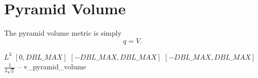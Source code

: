 \section{Pyramid Volume}

The pyramid volume metric is simply
\[
q = V.
\]

%
{$L^3$}%
{$[0,DBL\_MAX]$}%
{$[-DBL\_MAX,DBL\_MAX]$}%
{$[-DBL\_MAX,DBL\_MAX]$}%
{$\frac{1}{3\sqrt{2}}$}%
{--}%
{v\_pyramid\_volume}%
